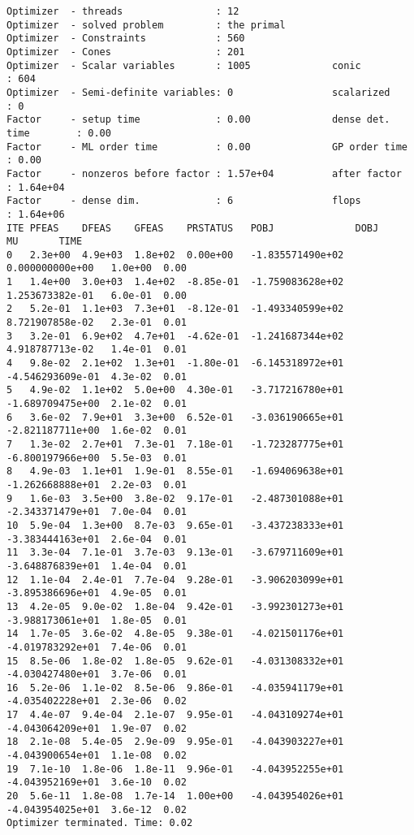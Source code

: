\documentclass[
  10pt,
  a4paper,
,tablecaptionabove
]{scrartcl}
\begin{document}
\begin{verbatim}
Optimizer  - threads                : 12              
Optimizer  - solved problem         : the primal      
Optimizer  - Constraints            : 560
Optimizer  - Cones                  : 201
Optimizer  - Scalar variables       : 1005              conic                  : 604             
Optimizer  - Semi-definite variables: 0                 scalarized             : 0               
Factor     - setup time             : 0.00              dense det. time        : 0.00            
Factor     - ML order time          : 0.00              GP order time          : 0.00            
Factor     - nonzeros before factor : 1.57e+04          after factor           : 1.64e+04        
Factor     - dense dim.             : 6                 flops                  : 1.64e+06        
ITE PFEAS    DFEAS    GFEAS    PRSTATUS   POBJ              DOBJ              MU       TIME  
0   2.3e+00  4.9e+03  1.8e+02  0.00e+00   -1.835571490e+02  0.000000000e+00   1.0e+00  0.00  
1   1.4e+00  3.0e+03  1.4e+02  -8.85e-01  -1.759083628e+02  1.253673382e-01   6.0e-01  0.00  
2   5.2e-01  1.1e+03  7.3e+01  -8.12e-01  -1.493340599e+02  8.721907858e-02   2.3e-01  0.01  
3   3.2e-01  6.9e+02  4.7e+01  -4.62e-01  -1.241687344e+02  4.918787713e-02   1.4e-01  0.01  
4   9.8e-02  2.1e+02  1.3e+01  -1.80e-01  -6.145318972e+01  -4.546293609e-01  4.3e-02  0.01  
5   4.9e-02  1.1e+02  5.0e+00  4.30e-01   -3.717216780e+01  -1.689709475e+00  2.1e-02  0.01  
6   3.6e-02  7.9e+01  3.3e+00  6.52e-01   -3.036190665e+01  -2.821187711e+00  1.6e-02  0.01  
7   1.3e-02  2.7e+01  7.3e-01  7.18e-01   -1.723287775e+01  -6.800197966e+00  5.5e-03  0.01  
8   4.9e-03  1.1e+01  1.9e-01  8.55e-01   -1.694069638e+01  -1.262668888e+01  2.2e-03  0.01  
9   1.6e-03  3.5e+00  3.8e-02  9.17e-01   -2.487301088e+01  -2.343371479e+01  7.0e-04  0.01  
10  5.9e-04  1.3e+00  8.7e-03  9.65e-01   -3.437238333e+01  -3.383444163e+01  2.6e-04  0.01  
11  3.3e-04  7.1e-01  3.7e-03  9.13e-01   -3.679711609e+01  -3.648876839e+01  1.4e-04  0.01  
12  1.1e-04  2.4e-01  7.7e-04  9.28e-01   -3.906203099e+01  -3.895386696e+01  4.9e-05  0.01  
13  4.2e-05  9.0e-02  1.8e-04  9.42e-01   -3.992301273e+01  -3.988173061e+01  1.8e-05  0.01  
14  1.7e-05  3.6e-02  4.8e-05  9.38e-01   -4.021501176e+01  -4.019783292e+01  7.4e-06  0.01  
15  8.5e-06  1.8e-02  1.8e-05  9.62e-01   -4.031308332e+01  -4.030427480e+01  3.7e-06  0.01  
16  5.2e-06  1.1e-02  8.5e-06  9.86e-01   -4.035941179e+01  -4.035402228e+01  2.3e-06  0.02  
17  4.4e-07  9.4e-04  2.1e-07  9.95e-01   -4.043109274e+01  -4.043064209e+01  1.9e-07  0.02  
18  2.1e-08  5.4e-05  2.9e-09  9.95e-01   -4.043903227e+01  -4.043900654e+01  1.1e-08  0.02  
19  7.1e-10  1.8e-06  1.8e-11  9.96e-01   -4.043952255e+01  -4.043952169e+01  3.6e-10  0.02  
20  5.6e-11  1.8e-08  1.7e-14  1.00e+00   -4.043954026e+01  -4.043954025e+01  3.6e-12  0.02  
Optimizer terminated. Time: 0.02    


\end{verbatim}
\end{document}

